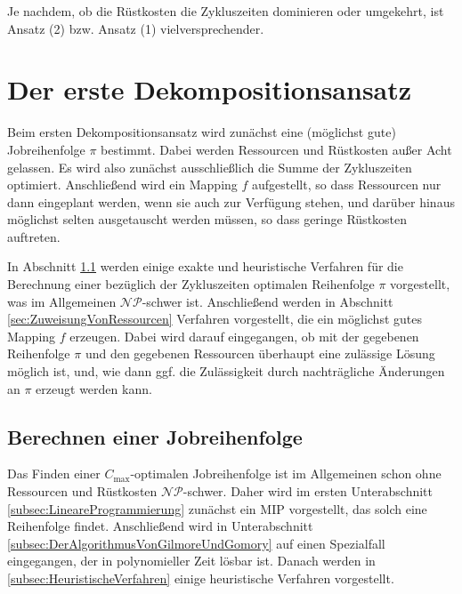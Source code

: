 \documentclass{scrreprt}
\begin{document}
Je nachdem, ob die Rüstkosten die Zykluszeiten dominieren oder umgekehrt, ist Ansatz (2) bzw. Ansatz (1) vielversprechender.


\chapter{Der erste Dekompositionsansatz}
\label{chap:DerErsteDekompositionsansatz}
Beim ersten Dekompositionsansatz wird zunächst eine (möglichst gute) Jobreihenfolge $\pi$ bestimmt.
Dabei werden Ressourcen und Rüstkosten außer Acht gelassen. 
Es wird also zunächst ausschließlich die Summe der Zykluszeiten optimiert. Anschließend wird ein Mapping $f$ aufgestellt,
so dass Ressourcen nur dann eingeplant werden, wenn sie auch zur Verfügung stehen, und darüber hinaus
möglichst selten ausgetauscht werden müssen, so dass geringe Rüstkosten auftreten.

In Abschnitt \ref{sec:BerechnenEinerJobreihenfolge} werden einige exakte und heuristische Verfahren für die
Berechnung einer bezüglich der Zykluszeiten optimalen Reihenfolge $\pi$ vorgestellt, was im Allgemeinen $\mathcal{NP}$-schwer ist.
Anschließend werden in Abschnitt \ref{sec:ZuweisungVonRessourcen} Verfahren vorgestellt, die ein möglichst gutes Mapping $f$ erzeugen.
Dabei wird darauf eingegangen, ob mit der gegebenen Reihenfolge $\pi$ und den gegebenen Ressourcen
überhaupt eine zulässige Lösung möglich ist, und, wie dann ggf. die Zulässigkeit durch nachträgliche Änderungen an $\pi$
erzeugt werden kann.

\section{Berechnen einer Jobreihenfolge}
\label{sec:BerechnenEinerJobreihenfolge}
Das Finden einer $C_{\max}$-optimalen Jobreihenfolge ist im Allgemeinen schon ohne Ressourcen und Rüstkosten $\mathcal{NP}$-schwer.
Daher wird im ersten Unterabschnitt \ref{subsec:LineareProgrammierung} zunächst ein MIP vorgestellt,
das solch eine Reihenfolge findet.
Anschließend wird in Unterabschnitt \ref{subsec:DerAlgorithmusVonGilmoreUndGomory} auf einen Spezialfall eingegangen, der in polynomieller Zeit lösbar ist.
Danach werden in \ref{subsec:HeuristischeVerfahren} einige heuristische Verfahren vorgestellt.
\end{document}
